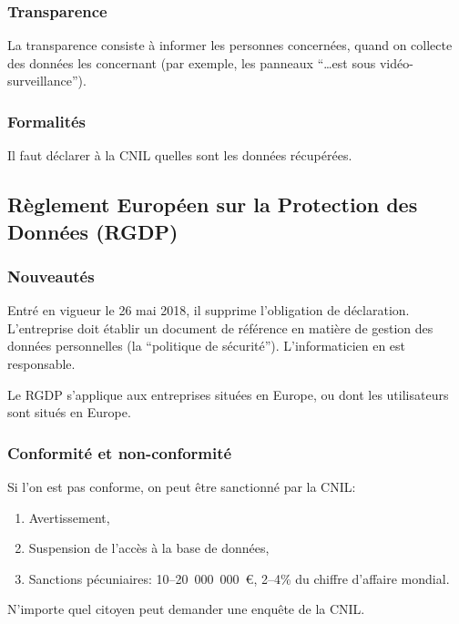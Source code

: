 \documentclass[10pt,a4paper,french]{article}
\begin{document}
\subsubsection{Transparence}

La transparence consiste à informer les personnes concernées, quand on collecte des données les concernant (par exemple, les panneaux ``\ldots est sous vidéo-surveillance'').

\subsubsection{Formalités}

Il faut déclarer à la CNIL quelles sont les données récupérées.

\subsection{Règlement Européen sur la Protection des Données (RGDP)}\label{s:rgdp}

\subsubsection{Nouveautés}

Entré en vigueur le 26 mai 2018, il supprime l'obligation de déclaration. L'entreprise doit établir un document de référence en matière de gestion des données personnelles (la ``politique de sécurité'').
L'informaticien en est responsable.

Le RGDP s'applique aux entreprises situées en Europe, ou dont les utilisateurs sont situés en Europe.

\subsubsection{Conformité et non-conformité}

Si l'on est pas conforme, on peut être sanctionné par la CNIL:
\begin{enumerate}
\item Avertissement,
\item Suspension de l'accès à la base de données,
\item Sanctions pécuniaires: 10--20~000~000~\euro, 2--4\% du chiffre d'affaire mondial.
\end{enumerate}

N'importe quel citoyen peut demander une enquête de la CNIL.
\end{document}

